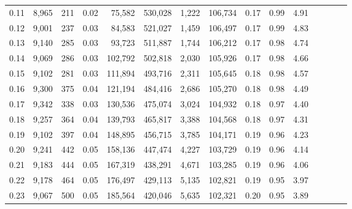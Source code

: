 \begin{tabular}{rrrcrrrrrrrrrrr}
0.11 &  8,965 &    211 &                                       0.02 &   75,582 &  530,028 &    1,222 &  106,734 &  0.17 &  0.99 &                         4.91 \\
0.12 &  9,001 &    237 &                                       0.03 &   84,583 &  521,027 &    1,459 &  106,497 &  0.17 &  0.99 &                         4.83 \\
0.13 &  9,140 &    285 &                                       0.03 &   93,723 &  511,887 &    1,744 &  106,212 &  0.17 &  0.98 &                         4.74 \\
0.14 &  9,069 &    286 &                                       0.03 &  102,792 &  502,818 &    2,030 &  105,926 &  0.17 &  0.98 &                         4.66 \\
0.15 &  9,102 &    281 &                                       0.03 &  111,894 &  493,716 &    2,311 &  105,645 &  0.18 &  0.98 &                         4.57 \\
0.16 &  9,300 &    375 &                                       0.04 &  121,194 &  484,416 &    2,686 &  105,270 &  0.18 &  0.98 &                         4.49 \\
0.17 &  9,342 &    338 &                                       0.03 &  130,536 &  475,074 &    3,024 &  104,932 &  0.18 &  0.97 &                         4.40 \\
0.18 &  9,257 &    364 &                                       0.04 &  139,793 &  465,817 &    3,388 &  104,568 &  0.18 &  0.97 &                         4.31 \\
0.19 &  9,102 &    397 &                                       0.04 &  148,895 &  456,715 &    3,785 &  104,171 &  0.19 &  0.96 &                         4.23 \\
0.20 &  9,241 &    442 &                                       0.05 &  158,136 &  447,474 &    4,227 &  103,729 &  0.19 &  0.96 &                         4.14 \\
0.21 &  9,183 &    444 &                                       0.05 &  167,319 &  438,291 &    4,671 &  103,285 &  0.19 &  0.96 &                         4.06 \\
0.22 &  9,178 &    464 &                                       0.05 &  176,497 &  429,113 &    5,135 &  102,821 &  0.19 &  0.95 &                         3.97 \\
0.23 &  9,067 &    500 &                                       0.05 &  185,564 &  420,046 &    5,635 &  102,321 &  0.20 &  0.95 &                         3.89 \\

\end{tabular}
